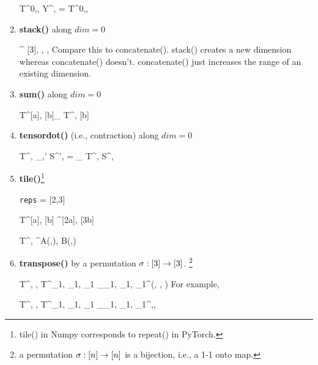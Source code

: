 \begin{enumerate}
\beq
T^{0,\beta, \gamma}
\rarrow
Y^{\beta, \gamma}=
T^{0,\beta, \gamma}
\eeq

\item {\bf stack()} along $dim=0$

\rarrow
{}^{
[3], \alpha, \beta, \gamma}
\eeq
Compare this to concatenate(). stack()
creates a new dimension 
whereas concatenate() doesn't. concatenate() just increases the range
of an existing dimension.

\item {\bf sum()} along $dim=0$

\beq
T^{[a], [b]}\rarrow \sum_{\alp} T^{\alp, [b]}
\eeq

\item {\bf tensordot()} (i.e., contraction) along $dim=0$

\rarrow 
T^{\alpha, \beta}\delta_{\alpha,\alpha'} S^{\alpha',\beta}
=
\sum_\alp
T^{\alp, \beta}S^{\alp, \beta}
\eeq

\item {\bf  tile()}\footnote{
tile() in Numpy corresponds
to repeat() in PyTorch.}

\beq
{\tt reps} = [2,3]
\eeq

\beq
T^{[a], [b]}\rarrow 
{}
^{[2a], [3b]}
\eeq

\beq
T^{\alp, \beta}\rarrow 
{}^{A(\alp,\beta), B(\alp,\beta)}
\eeq



\item {\bf transpose()} by a permutation
$\sigma:[3]\rightarrow [3]$. \footnote{ a permutation $\sigma:[n] \rightarrow [n]$ is a bijection, i.e., a 1-1 onto map.}

\beq
T^{\alpha, \beta, \gamma} \rarrow T^{\alpha_1, \beta_1, \gamma_1}
\delta_{\alpha_1, \beta_1, \gamma_1}^{\sigma(\alpha, \beta, \gamma)}
\eeq
For example,

\beq
T^{\alpha, \beta, \gamma} \rarrow T^{\alpha_1, \beta_1, \gamma_1}
\delta_{\alpha_1, \beta_1, \gamma_1}^{\gamma,\beta,\alpha}
\eeq

\end{enumerate}

